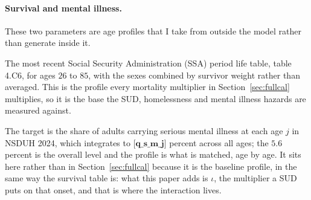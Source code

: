 \documentclass[10pt]{article}
\begin{document}
\paragraph{Survival and mental illness.} These two parameters are age profiles that I take from outside the model rather than generate inside it.
\begin{description}\setlength{\itemsep}{0.25em}\setlength{\parskip}{0em}
\item[$\bar\phi(j)$, baseline survival by age.] The most recent Social Security
Administration (SSA) period life table, table 4.C6, for ages $26$ to $85$, with the sexes
combined by survivor weight rather than averaged. This is the profile every mortality multiplier in
Section~\ref{sec:fullcal} multiplies, so it is the base the SUD, homelessness and
mental illness hazards are measured against.

\item[$s_m(j)$, the age profile of SMI prevalence.]
The target is the share of adults carrying serious mental illness at each age $j$
in NSDUH 2024, which integrates to $\textbf{[q_s_m_j]}$ percent across all ages; the $5.6$ percent
is the overall level and the profile is what is matched, age by age. It sits here
rather than in Section~\ref{sec:fullcal} because it is the baseline profile, in the
same way the survival table is: what this paper adds is $\iota$, the multiplier a SUD
puts on that onset, and that is where the interaction lives.

\end{description}
\end{document}
